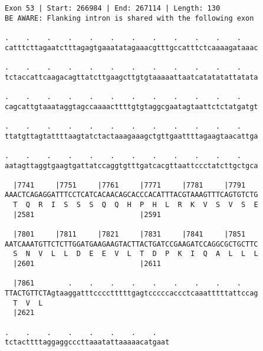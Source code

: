 \documentclass{article}
\begin{document}
\begin{Verbatim}
Exon 53 | Start: 266984 | End: 267114 | Length: 130
BE AWARE: Flanking intron is shared with the following exon
 
.    .    .    .    .    .    .    .    .    .    .    .    
catttcttagaatctttagagtgaaatatagaaacgtttgccatttctcaaaagataaac
  
.    .    .    .    .    .    .    .    .    .    .    .    
tctaccattcaagacagttatcttgaagcttgtgtaaaaattaatcatatatattatata
  
.    .    .    .    .    .    .    .    .    .    .    .    
cagcattgtaaataggtagccaaaacttttgtgtaggcgaatagtaattctctatgatgt
  
.    .    .    .    .    .    .    .    .    .    .    .    
ttatgttagtattttaagtatctactaaagaaagctgttgaattttagaagtaacattga
  
.    .    .    .    .    .    .    .    .    .    .    .    
aatagttaggtgaagtgattatccaggtgtttgatcacgttaattccctatcttgctgca
  
  |7741     |7751     |7761     |7771     |7781     |7791   
AAACTCAGAGGATTTCCTCATCACAACAGCACCCACATTTACGTAAAGTTTCAGTGTCTG
  T  Q  R  I  S  S  S  Q  Q  H  P  H  L  R  K  V  S  V  S  E
  |2581                         |2591                       
  
  |7801     |7811     |7821     |7831     |7841     |7851   
AATCAAATGTTCTCTTGGATGAAGAAGTACTTACTGATCCGAAGATCCAGGCGCTGCTTC
  S  N  V  L  L  D  E  E  V  L  T  D  P  K  I  Q  A  L  L  L
  |2601                         |2611                       
  
  |7861        .    .    .    .    .    .    .    .    .    
TTACTGTTCTAgtaaggatttcccctttttgagtcccccaccctcaaatttttattccag
  T  V  L                                                   
  |2621                                                     
  
.    .    .    .    .    .    .    .   
tctacttttaggaggcccttaaatattaaaaacatgaat
\end{Verbatim}
\newpage
\end{document}
